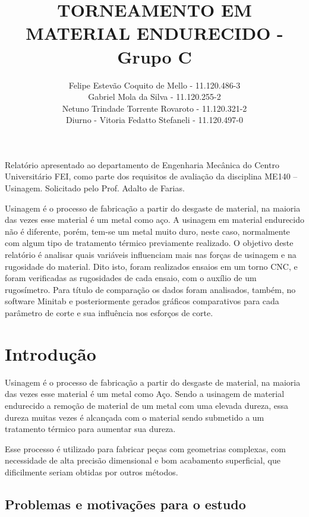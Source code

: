 \documentclass[deposito, acronym, symbols]{fei}
\title{TORNEAMENTO EM MATERIAL ENDURECIDO - Grupo C}
\author{ Felipe Estevão Coquito de Mello - 11.120.486-3 \\ Gabriel Mola da Silva - 11.120.255-2 \\ Netuno Trindade Torrente Rovaroto - 11.120.321-2 \\ Diurno - Vitoria Fedatto Stefaneli - 11.120.497-0}
\begin{document}
\maketitle

\begin{folhaderosto}
Relatório apresentado ao departamento de Engenharia Mecânica do Centro Universitário FEI, como parte dos requisitos de avaliação da disciplina ME140 – Usinagem. Solicitado pelo Prof. Adalto de Farias.
\end{folhaderosto}

\tableofcontents
\listoffigures
\listoftables

\begin{resumo}

Usinagem é o processo de fabricação a partir do desgaste de material, na maioria das vezes esse material é um metal como aço. A usinagem em material endurecido não é diferente, porém, tem-se um metal muito duro, neste caso, normalmente com algum tipo de tratamento térmico previamente realizado. O objetivo deste relatório é analisar quais variáveis influenciam mais nas forças de usinagem e na rugosidade do material. Dito isto, foram realizados ensaios em um torno CNC, e foram verificadas as rugosidades de cada ensaio, com o auxílio de um rugosímetro. Para título de comparação os dados foram analisados, também, no software Minitab e posteriormente gerados gráficos comparativos para cada parâmetro de corte e sua influência nos esforços de corte.


\end{resumo}

\chapter{Introdução}

Usinagem é o processo de fabricação a partir do desgaste de material, na maioria das vezes esse material é um metal como Aço. Sendo a usinagem de material endurecido a remoção de material de um metal com uma elevada dureza, essa dureza muitas vezes é alcançada com o material sendo submetido a um tratamento térmico para aumentar sua dureza.

Esse processo é utilizado para fabricar peças com geometrias complexas, com necessidade de alta precisão dimensional e bom acabamento superficial, que dificilmente seriam obtidas por outros métodos.

\section{Problemas e motivações para o estudo}
\end{document}
